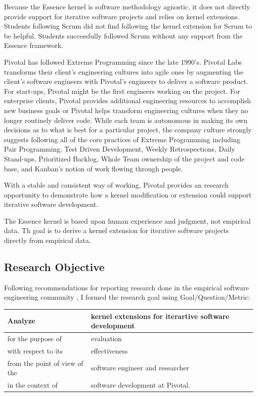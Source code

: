 \documentclass[preprint,12pt,3p]{elsarticle}
\begin{document}
Because the Essence kernel is software methodology agnostic, it does not directly provide support for iterative software projects \cite{ICSE2014} and relies on kernel extensions. Students following Scrum did not find following the kernel extension for Scrum to be helpful. Students successfully followed Scrum without any support from the Essence framework.

Pivotal has followed Extreme Programming \cite{ExtremeProgrammingExplained} since the late 1990's. Pivotal Labs transforms their client's engineering cultures into agile ones by augmenting the client's software engineers with Pivotal's engineers to deliver a software product. For start-ups, Pivotal might be the first engineers working on the project. For enterprise clients, Pivotal provides additional engineering resources to accomplish new business goals or Pivotal helps transform engineering cultures when they no longer routinely deliver code.  While each team is autonomous in making its own decisions as to what is best for a particular project, the company culture strongly suggests following all of the core practices of Extreme Programming including Pair Programming, Test Driven Development, Weekly Retrospections, Daily Stand-ups, Prioritized Backlog, Whole Team ownership of the project and code base, and Kanban's notion of work flowing through people. 

With a stable and consistent way of working, Pivotal provides an research opportunity to demonstrate how a kernel modification or extension could support iterative software development. 

The Essence kernel is based upon human experience and judgment, not empirical data. Th goal is to derive a kernel extension for iterative software projects directly from empirical data. 

\subsection{Research Objective}
Following recommendations for reporting research done in the empirical
software engineering community
\cite{GQM, Shaw}, I formed the
research goal using Goal/Question/Metric:
\cite{GQM}

\begin{table}[h]
\centering
\begin{tabular}{|p{2.00in}|p{4.10in}|}
\hline
Analyze & kernel extensions for iterartive software development \\ \hline
for the purpose of & evaluation \\ \hline
with respect to its & effectiveness \\ \hline
from the point of view of the & software engineer and researcher \\ \hline
in the context of & software development at Pivotal. \\
\hline
\end{tabular}
\end{table}
\end{document}
